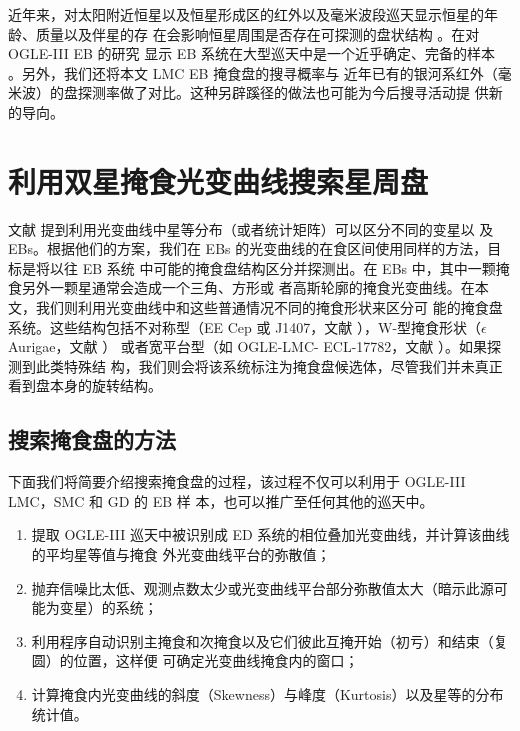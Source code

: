 近年来，对太阳附近恒星以及恒星形成区的红外以及毫米波段巡天显示恒星的年龄、质量以及伴星的存
在会影响恒星周围是否存在可探测的盘状结构
\cite{Haisch2001,Bouwman2006,Hernandez2007,Harris2012,DeRosa2013}。在对 OGLE-III EB 的研究
显示 EB 系统在大型巡天中是一个近乎确定、完备的样本
\cite{Graczyk2011,Pawlak2013,Pietrukowicz2013}。另外，我们还将本文 LMC  EB 掩食盘的搜寻概率与
近年已有的银河系红外（毫米波）的盘探测率做了对比。这种另辟蹊径的做法也可能为今后搜寻活动提
供新的导向。

\section{利用双星掩食光变曲线搜索星周盘} \label{sec:discsineb}

文献  提到利用光变曲线中星等分布（或者统计矩阵）可以区分不同的变星以
及 EBs。根据他们的方案，我们在 EBs 的光变曲线的在食区间使用同样的方法，目标是将以往 EB 系统
中可能的掩食盘结构区分并探测出。在 EBs 中，其中一颗掩食另外一颗星通常会造成一个三角、方形或
者高斯轮廓的掩食光变曲线。在本文，我们则利用光变曲线中和这些普通情况不同的掩食形状来区分可
能的掩食盘系统。这些结构包括不对称型（EE Cep 或 J1407，文献 
），W-型掩食形状（$\epsilon$ Aurigae，文献  ）
或者宽平台型（如 OGLE-LMC- ECL-17782，文献 ）。如果探测到此类特殊结
构，我们则会将该系统标注为掩食盘候选体，尽管我们并未真正看到盘本身的旋转结构。


\subsection{搜索掩食盘的方法} \label{sec:discebmeth}

下面我们将简要介绍搜索掩食盘的过程，该过程不仅可以利用于 OGLE-III LMC，SMC 和 GD 的 EB 样
本，也可以推广至任何其他的巡天中。

\begin{enumerate}
\item 提取 OGLE-III 巡天中被识别成 ED 系统的相位叠加光变曲线，并计算该曲线的平均星等值与掩食
外光变曲线平台的弥散值；
\item 抛弃信噪比太低、观测点数太少或光变曲线平台部分弥散值太大（暗示此源可能为变星）的系统；
\item 利用程序自动识别主掩食和次掩食以及它们彼此互掩开始（初亏）和结束（复圆）的位置，这样便
可确定光变曲线掩食内的窗口；
\item 计算掩食内光变曲线的斜度（Skewness）与峰度（Kurtosis）以及星等的分布统计值。
\end{enumerate}

